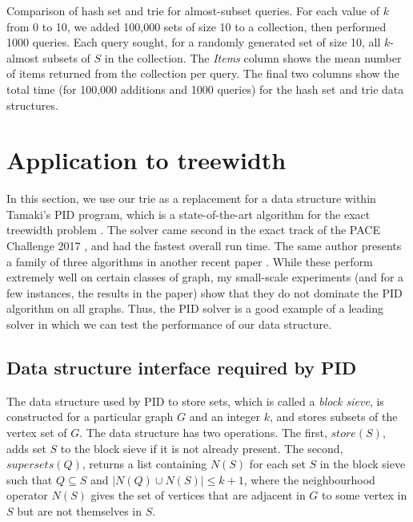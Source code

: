 \begin{table}[h]
    \centering
    
    \caption{Comparison of hash set and trie for almost-subset queries.
        For each value of $k$ from 0 to 10, we added 100,000 sets of size 10
        to a collection, then performed 1000 queries.  Each query sought,
        for a randomly generated set of size 10, 
        all $k$-almost subsets of $S$ in the collection.  The \emph{Items}
        column shows the mean number of items returned from the collection
        per query.  The final two columns show the total time (for
        100,000 additions and 1000 queries) for the hash set and trie data
        structures.}
    \label{table:experiment1}
\end{table}

\section{Application to treewidth}

In this section, we use our trie as a replacement for a data structure within
Tamaki's PID program, which is a state-of-the-art algorithm for the exact
treewidth problem \cite{DBLP:journals/jco/Tamaki19}.  The solver came second in
the exact track of the PACE Challenge 2017 \cite{DBLP:conf/iwpec/DellKTW17},
and had the fastest overall run time.  The same author presents a family of
three algorithms in another recent paper \cite{DBLP:conf/sea2/Tamaki19}.
While these perform extremely well on certain classes of graph, my small-scale
experiments (and for a few instances, the results in the paper) show that they
do not dominate the PID algorithm on all graphs.  Thus, the PID solver
is a good example of a leading solver in which we can test the performance
of our data structure.

\subsection{Data structure interface required by PID}

The data structure used by PID to store sets, which is called a \emph{block
sieve}, is constructed for a particular graph $G$ and an integer $k$, and stores subsets
of the vertex set of $G$.  The data structure has two operations.  The first,
$\mathit{store}(S)$, adds set $S$ to the block sieve if it is not already present.
The second, $\mathit{supersets}(Q)$, returns a list containing $N(S)$ for each set
$S$ in the block sieve such that $Q \subseteq S$ and $|N(Q) \cup N(S)| \leq k + 1$,
where the neighbourhood operator $N(S)$ gives the set of vertices that are adjacent
in $G$ to some vertex in $S$ but are not themselves in $S$.

